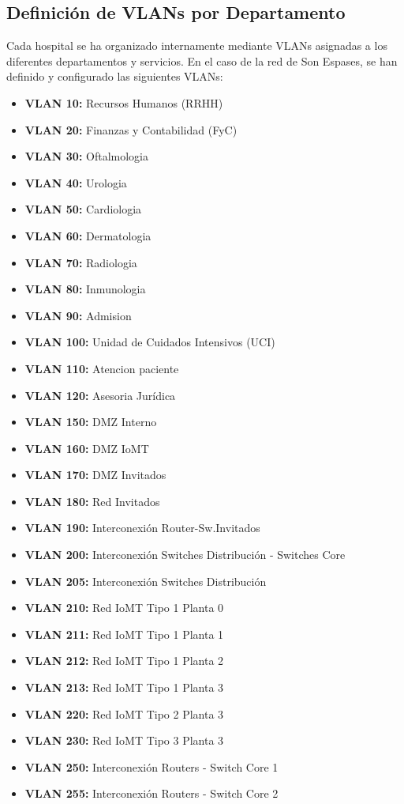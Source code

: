 \subsection{Definición de VLANs por Departamento}
\label{subsec:VLANs}
Cada hospital se ha organizado internamente mediante VLANs asignadas a los diferentes departamentos y servicios. En el caso de la red de Son Espases, se han definido y configurado 
las siguientes VLANs: 
\begin{itemize}
    \item \textbf{VLAN 10:} Recursos Humanos (RRHH)
    \item \textbf{VLAN 20:} Finanzas y Contabilidad (FyC)
    \item \textbf{VLAN 30:} Oftalmologia
    \item \textbf{VLAN 40:} Urologia 
    \item \textbf{VLAN 50:} Cardiologia 
    \item \textbf{VLAN 60:} Dermatologia 
    \item \textbf{VLAN 70:} Radiologia 
    \item \textbf{VLAN 80:} Inmunologia 
    \item \textbf{VLAN 90:} Admision
    \item \textbf{VLAN 100:} Unidad de Cuidados Intensivos (UCI)
    \item \textbf{VLAN 110:} Atencion paciente 
    \item \textbf{VLAN 120:} Asesoria Jurídica
    \item \textbf{VLAN 150:} DMZ Interno
    \item \textbf{VLAN 160:} DMZ IoMT
    \item \textbf{VLAN 170:} DMZ Invitados
    \item \textbf{VLAN 180:} Red Invitados
    \item \textbf{VLAN 190:} Interconexión Router-Sw.Invitados
    \item \textbf{VLAN 200:} Interconexión Switches Distribución - Switches Core
    \item \textbf{VLAN 205:} Interconexión Switches Distribución
    \item \textbf{VLAN 210:} Red IoMT Tipo 1 Planta 0
    \item \textbf{VLAN 211:} Red IoMT Tipo 1 Planta 1
    \item \textbf{VLAN 212:} Red IoMT Tipo 1 Planta 2
    \item \textbf{VLAN 213:} Red IoMT Tipo 1 Planta 3
    \item \textbf{VLAN 220:} Red IoMT Tipo 2 Planta 3
    \item \textbf{VLAN 230:} Red IoMT Tipo 3 Planta 3
    \item \textbf{VLAN 250:} Interconexión Routers - Switch Core 1
    \item \textbf{VLAN 255:} Interconexión Routers - Switch Core 2
\end{itemize}

